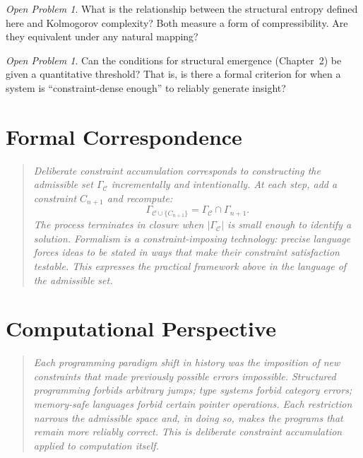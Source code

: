 \documentclass[11pt]{book}
\theoremstyle{plain}
\theoremstyle{definition}
\theoremstyle{remark}
\newtheorem{openproblem}[theorem]{Open Problem}
\newenvironment{formalcorrespondence}
  {\begin{quote}\small\itshape}
  {\end{quote}}
\newenvironment{computationalaside}
  {\begin{quote}\small\itshape}
  {\end{quote}}
\begin{document}
\begin{openproblem}
What is the relationship between the structural entropy defined here and
Kolmogorov complexity? Both measure a form of compressibility. Are they
equivalent under any natural mapping?
\end{openproblem}

\begin{openproblem}
Can the conditions for structural emergence (Chapter~2) be given a
quantitative threshold? That is, is there a formal criterion for when
a system is ``constraint-dense enough'' to reliably generate insight?
\end{openproblem}

\section*{Formal Correspondence}
\begin{formalcorrespondence}
Deliberate constraint accumulation corresponds to constructing the
admissible set $\Gamma_{\mathcal{C}}$ incrementally and intentionally.
At each step, add a constraint $C_{n+1}$ and recompute:
\[
  \Gamma_{\mathcal{C} \cup \{C_{n+1}\}} = \Gamma_{\mathcal{C}} \cap \Gamma_{n+1}.
\]
The process terminates in closure when $|\Gamma_{\mathcal{C}}|$ is
small enough to identify a solution. Formalism is a constraint-imposing
technology: precise language forces ideas to be stated in ways that make
their constraint satisfaction testable. This expresses the practical
framework above in the language of the admissible set.
\end{formalcorrespondence}

\section*{Computational Perspective}
\begin{computationalaside}
Each programming paradigm shift in history was the imposition of new
constraints that made previously possible errors impossible. Structured
programming forbids arbitrary jumps; type systems forbid category errors;
memory-safe languages forbid certain pointer operations. Each restriction
narrows the admissible space and, in doing so, makes the programs that
remain more reliably correct. This is deliberate constraint accumulation
applied to computation itself.
\end{computationalaside}
\end{document}
